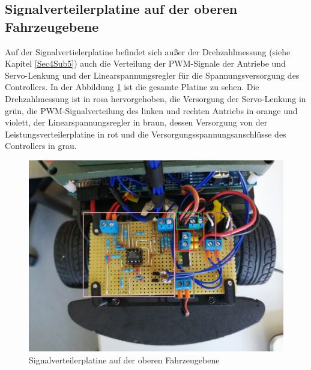 \subsection{Signalverteilerplatine auf der oberen Fahrzeugebene}\label{Sec8Sub2}

Auf der Signalvertielerplatine befindet sich außer der Drehzahlmessung (siehe Kapitel \ref{Sec4Sub5}) auch die Verteilung der PWM-Signale der Antriebe und Servo-Lenkung und der Linearspannungsregler für die Spannungsversorgung des Controllers. In der Abbildung \ref{fig:Signalverteilerplatine} ist die gesamte Platine zu sehen. Die Drehzahlmessung ist in rosa hervorgehoben, die Versorgung der Servo-Lenkung in grün, die PWM-Signalverteilung des linken und rechten Antriebs in orange und violett, der Linearspannungsregler in braun, dessen Versorgung von der Leistungsverteilerplatine in rot und die Versorgungsspannungsanschlüsse des Controllers in grau. 


\begin{figure}[H] %
\includegraphics[width=.7\textwidth]{sec8/images/Signalverteilerplatine} 
\centering
\captionsetup{width=.9\textwidth}
\caption[Signalverteilerplatine auf der oberen Fahrzeugebene]{Signalverteilerplatine auf der oberen Fahrzeugebene}
\centering
\label{fig:Signalverteilerplatine}
\end{figure}


\newpage
